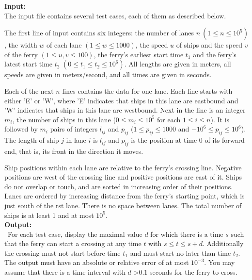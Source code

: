 \documentclass[12pt]{article}
\begin{document}
\noindent \textbf{Input:} \\
The input file contains several test cases, each of them as described below.

The first line of input contains six integers: the number of lanes $n\ (1 \leq n \leq 10^5)$, the width $w$ of each
lane $(1 \leq w \leq 1000)$, the speed $u$ of ships and the speed $v$ of the ferry $(1 \leq u,v \leq 100)$, the
ferry's earliest start time $t_1$ and the ferry's latest start time $t_2$ $(0 \leq t_1 \leq t_2 \leq 10^6)$. All
lengths are given in meters, all speeds are given in meters/second, and all times are given in seconds.

Each of the next $n$ lines contains the data for one lane.  Each line starts with either 'E' or 'W', where 'E'
indicates that ships in this lane are eastbound and 'W' indicates that ships in this lane are westbound. Next in
the line is an integer $m_i$, the number of ships in this lane ($0 \leq m_i \leq 10^5$ for each $1 \leq i \leq n$).
It is followed by $m_i$ pairs of integers $l_{ij}$ and $p_{ij}$ ($1 \leq p_{ij} \leq 1000$ and
$-10^6 \leq p_{ij} \leq 10^6$). The length of ship $j$ in lane $i$ is $l_{ij}$ and $p_{ij}$ is the position at time
0 of its forward end, that is, its front in the direction it moves.

Ship positions within each lane are relative to the ferry's crossing line. Negative positions are west
of the crossing line and positive positions are east of it. Ships do not overlap or touch, and are sorted
in increasing order of their positions. Lanes are ordered by increasing distance from the ferry's starting
point, which is just south of the  rst lane. There is no space between lanes. The total number of ships
is at least 1 and at most $10^5$. \\

\noindent \textbf{Output:} \\
~\indent For each test case, display the maximal value $d$ for which there is a time $s$ such that the ferry can
start a crossing at any time $t$ with $s \leq t \leq s + d$. Additionally the crossing must not start before time
$t_1$ and must start no later than time $t_2$. The output must have an absolute or relative error of at most
$10^{-3}$. You may assume that there is a time interval with $d$ \textgreater $0.1$ seconds for the ferry to cross.




\end{document}
